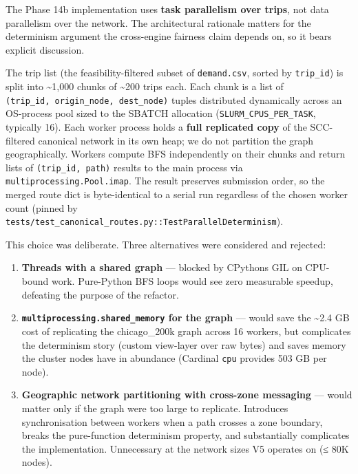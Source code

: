 The Phase 14b implementation uses \textbf{task parallelism over trips},
not data parallelism over the network. The architectural rationale
matters for the determinism argument the cross-engine fairness claim
depends on, so it bears explicit discussion.

The trip list (the feasibility-filtered subset of \texttt{demand.csv},
sorted by \texttt{trip\_id}) is split into \textasciitilde1,000 chunks
of \textasciitilde200 trips each. Each chunk is a list of
\texttt{(trip\_id,\ origin\_node,\ dest\_node)} tuples distributed
dynamically across an OS-process pool sized to the SBATCH allocation
(\texttt{SLURM\_CPUS\_PER\_TASK}, typically 16). Each worker process
holds a \textbf{full replicated copy} of the SCC-filtered canonical
network in its own heap; we do not partition the graph geographically.
Workers compute BFS independently on their chunks and return lists of
\texttt{(trip\_id,\ path)} results to the main process via
\texttt{multiprocessing.Pool.imap}. The result preserves submission
order, so the merged route dict is byte-identical to a serial run
regardless of the chosen worker count (pinned by
\texttt{tests/test\_canonical\_routes.py::TestParallelDeterminism}).

This choice was deliberate. Three alternatives were considered and
rejected:

\begin{enumerate}
\def\labelenumi{\arabic{enumi}.}
\tightlist
\item
  \textbf{Threads with a shared graph} --- blocked by
  CPython\textquotesingle s GIL on CPU-bound work. Pure-Python BFS loops
  would see zero measurable speedup, defeating the purpose of the
  refactor.
\item
  \textbf{\texttt{multiprocessing.shared\_memory} for the graph} ---
  would save the \textasciitilde2.4 GB cost of replicating the
  chicago\_200k graph across 16 workers, but complicates the determinism
  story (custom view-layer over raw bytes) and saves memory the cluster
  nodes have in abundance (Cardinal \texttt{cpu} provides 503 GB per
  node).
\item
  \textbf{Geographic network partitioning with cross-zone messaging} ---
  would matter only if the graph were too large to replicate. Introduces
  synchronisation between workers when a path crosses a zone boundary,
  breaks the pure-function determinism property, and substantially
  complicates the implementation. Unnecessary at the network sizes V5
  operates on (≤ 80K nodes).
\end{enumerate}

